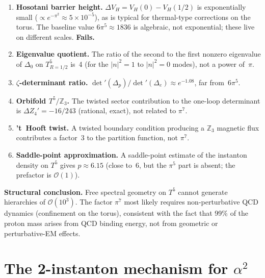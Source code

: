 \documentclass[11pt,a4paper]{article}
\begin{document}
\begin{enumerate}[leftmargin=1.5em]
\item \textbf{Hosotani barrier height.}  $\Delta V_H = V_H(0)-V_H(1/2)$
  is exponentially small ($\propto e^{-\pi^2}\approx 5\times10^{-5}$),
  as is typical for thermal-type corrections on the torus.  The baseline
  value $6\pi^5\approx 1836$ is algebraic, not exponential; these live on
  different scales.  \textbf{Fails.}

\item \textbf{Eigenvalue quotient.}  The ratio of the second to the first
  nonzero eigenvalue of $\Delta_0$ on $T^5_{R=1/2}$ is~4 (for the $|n|^2=1$ to $|n|^2=0$
  modes), not a power of~$\pi$.

\item \textbf{$\zeta$-determinant ratio.}  $\det'(\Delta_p)/\det'(\Delta_e)
  \approx e^{-1.08}$, far from~$6\pi^5$.

\item \textbf{Orbifold $T^5/\mathbb{Z}_3$.}  The twisted sector contribution
  to the one-loop determinant is $\Delta Z_4'=-16/243$ (rational, exact),
  not related to $\pi^7$.

\item \textbf{'t~Hooft twist.}  A twisted boundary condition producing a
  $\mathbb{Z}_3$ magnetic flux contributes a factor~3 to the partition function,
  not $\pi^7$.

\item \textbf{Saddle-point approximation.}  A saddle-point estimate of the
  instanton density on $T^5$ gives $p\approx6.15$ (close to~6, but the
  $\pi^5$ part is absent; the prefactor is $\mathcal{O}(1)$).
\end{enumerate}

\textbf{Structural conclusion.}  Free spectral geometry on $T^5$ cannot
generate hierarchies of $\mathcal{O}(10^3)$.  The factor $\pi^7$ most likely
requires non-perturbative QCD dynamics (confinement on the torus), consistent
with the fact that 99\% of the proton mass arises from QCD binding energy, not
from geometric or perturbative-EM effects.

\section{The 2-instanton mechanism for $\alpha^2$}
\label{sec:2instanton}
\end{document}
